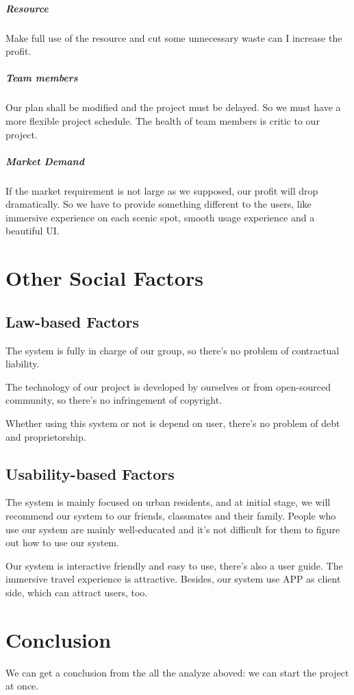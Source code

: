 \documentclass[10pt]{article}
\begin{document}
\subparagraph{Resource}
Make full use of the resource and cut some unnecessary waste can I increase the profit.

\subparagraph{Team members}
Our plan shall be modified and the project must be delayed. So we must have a more flexible project schedule. The health of team members is critic to our project. 

\subparagraph{Market Demand}
If the market requirement is not large as we supposed, our profit will drop dramatically. So we have to provide something different to the users, like immersive experience on each scenic spot, smooth usage experience and a beautiful UI.

\section{Other Social Factors}
\subsection{Law-based Factors}
The system is fully in charge of our group, so there’s no problem of contractual liability.

The technology of our project is developed by ourselves or from open-sourced community, so there’s no infringement of copyright.

Whether using this system or not is depend on user, there’s no problem of debt and proprietorship.

\subsection{Usability-based Factors}
The system is mainly focused on urban residents, and at initial stage, we will recommend our system to our friends, classmates and their family. People who use our system are mainly well-educated and it’s not difficult for them to figure out how to use our system.

Our system is interactive friendly and easy to use, there’s also a user guide. The immersive travel experience is attractive. Besides, our system use APP as client side, which can attract users, too.

\section{Conclusion}
We can get a conclusion from the all the analyze aboved: we can start the project at once.
\end{document}
